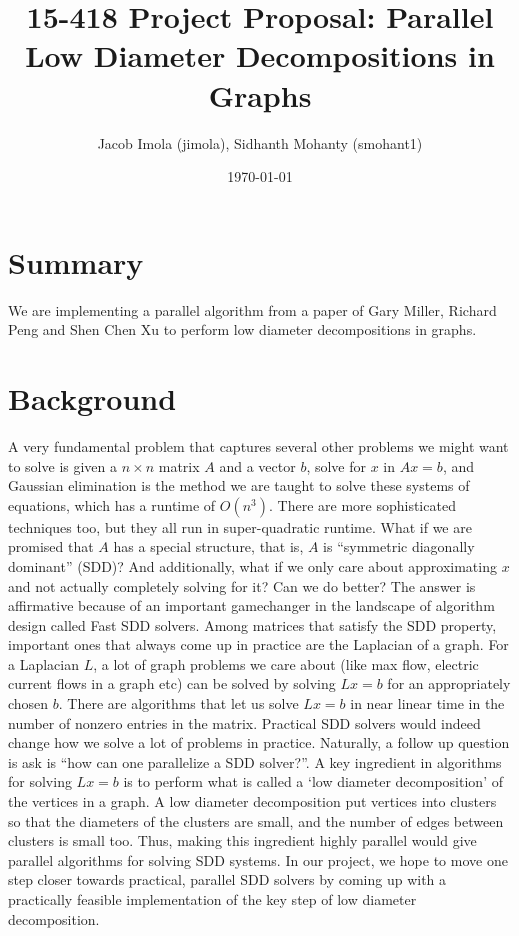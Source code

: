 \documentclass[11pt]{scrartcl}
\theoremstyle{plain}
\theoremstyle{definition}
\theoremstyle{remark}
\begin{document}
\title{15-418 Project Proposal: Parallel Low Diameter Decompositions in Graphs}
\author{\textsf{Jacob Imola (jimola), Sidhanth Mohanty (smohant1)}}
\date{\textsf{\today}}
\maketitle

\section{Summary}
We are implementing a parallel algorithm from a paper of Gary Miller, Richard Peng and Shen Chen Xu to perform low diameter decompositions in graphs.

\section{Background}
A very fundamental problem that captures several other problems we might want to solve is given a $n\times n$ matrix $A$ and a vector $b$, solve for $x$ in $Ax=b$, and Gaussian elimination is the method we are taught to solve these systems of equations, which has a runtime of $O(n^3)$. There are more sophisticated techniques too, but they all run in super-quadratic runtime. What if we are promised that $A$ has a special structure, that is, $A$ is ``symmetric diagonally dominant'' (SDD)? And additionally, what if we only care about approximating $x$ and not actually completely solving for it? Can we do better? The answer is affirmative because of an important gamechanger in the landscape of algorithm design called Fast SDD solvers. Among matrices that satisfy the SDD property, important ones that always come up in practice are the Laplacian of a graph. For a Laplacian $L$, a lot of graph problems we care about (like max flow, electric current flows in a graph etc) can be solved by solving $Lx=b$ for an appropriately chosen $b$. There are algorithms that let us solve $Lx=b$ in near linear time in the number of nonzero entries in the matrix. Practical SDD solvers would indeed change how we solve a lot of problems in practice. Naturally, a follow up question is ask is ``how can one parallelize a SDD solver?''. A key ingredient in algorithms for solving $Lx=b$ is to perform what is called a `low diameter decomposition' of the vertices in a graph. A low diameter decomposition put vertices into clusters so that the diameters of the clusters are small, and the number of edges between clusters is small too. Thus, making this ingredient highly parallel would give parallel algorithms for solving SDD systems. In our project, we hope to move one step closer towards practical, parallel SDD solvers by coming up with a practically feasible implementation of the key step of low diameter decomposition.
\end{document}
